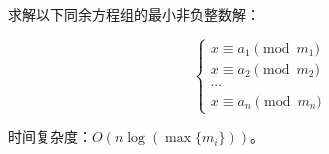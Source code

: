 求解以下同余方程组的最小非负整数解：

$$
\begin{cases}
x \equiv a_1 \pmod{m_1} \\
x \equiv a_2 \pmod{m_2} \\
\cdots \\
x \equiv a_n \pmod{m_n}
\end{cases}
$$

时间复杂度：$O(n\log(\max\{m_i\}))$。